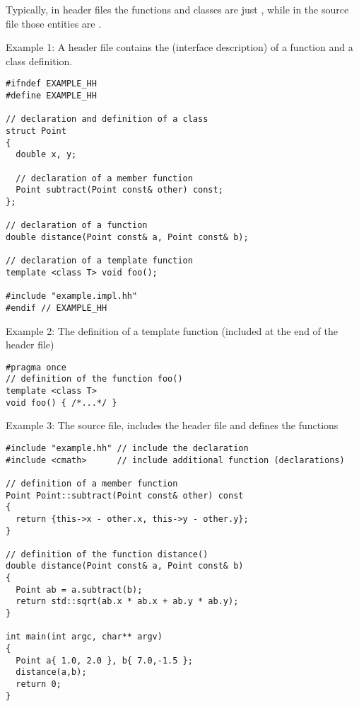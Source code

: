 Typically, in header files the functions and classes are just , while in the source file those entities are .

Example 1: A header file contains the  (interface description) of a function and a class definition.
\begin{verbatim}
#ifndef EXAMPLE_HH
#define EXAMPLE_HH

// declaration and definition of a class
struct Point
{
  double x, y;

  // declaration of a member function
  Point subtract(Point const& other) const;
};

// declaration of a function
double distance(Point const& a, Point const& b);

// declaration of a template function
template <class T> void foo();

#include "example.impl.hh"
#endif // EXAMPLE_HH
\end{verbatim}

Example 2: The definition of a template function (included at the end of the header file)

\begin{verbatim}
#pragma once
// definition of the function foo()
template <class T>
void foo() { /*...*/ }
\end{verbatim}

Example 3: The source file, includes the header file and defines the functions

\begin{verbatim}
#include "example.hh" // include the declaration
#include <cmath>      // include additional function (declarations)

// definition of a member function
Point Point::subtract(Point const& other) const
{
  return {this->x - other.x, this->y - other.y};
}

// definition of the function distance()
double distance(Point const& a, Point const& b)
{
  Point ab = a.subtract(b);
  return std::sqrt(ab.x * ab.x + ab.y * ab.y);
}

int main(int argc, char** argv)
{
  Point a{ 1.0, 2.0 }, b{ 7.0,-1.5 };
  distance(a,b);
  return 0;
}
\end{verbatim}


